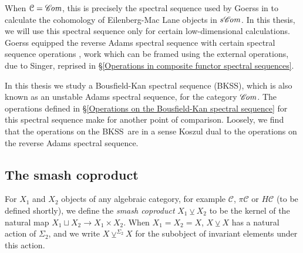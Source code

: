\documentclass[11pt]{amsart} \renewcommand{\baselinestretch}{1.2}
\theoremstyle{plain}
\numberwithin{equation}{section} %
\theoremstyle{plain}
\numberwithin{equation}{chapter} %
\renewcommand{\to}{\longrightarrow}
\newcommand{\scrC}{\mathscr{C}}
\newcommand{\calc}{\mathcal{C}}
\newcommand{\citeBOX}[2][]{\cite[\mbox{#1}]{#2}}
\newcommand{\PA}[1]{\pi#1}
\newcommand{\HA}[1]{H#1}
\newcommand{\algs}{{\scrC\!\textit{\normalfont\textit{om}}}}
\newcommand{\smashcoprod}{\veebar}%
\newcommand{\BKSS}{BKSS}
\newcommand{\SubsectionOrSection}[1]{\subsection{#1}}
\begin{document}
\begin{Pi-algebras and cohomology algebras}
When $\calc=\algs$, this is precisely the spectral sequence used by Goerss in \cite[Chapter V]{MR1089001} to calculate the cohomology of Eilenberg-Mac Lane objects in $s\algs$. In this thesis, we will use this spectral sequence only for certain low-dimensional calculations. Goerss equipped the reverse Adams spectral sequence with certain spectral sequence operations \citeBOX[\S14]{MR1089001}, work which can be framed using the external operations, due to Singer, reprised in \S\ref{Operations in composite functor spectral sequences}. %

In this thesis we study a Bousfield-Kan spectral sequence (BKSS), which is also known as an unstable Adams spectral sequence, for the category $\algs$. The operations defined in \S\ref{Operations on the Bousfield-Kan spectral sequence} for this spectral sequence make for another point of comparison. Loosely, we find that the operations on the \BKSS\ are in a sense Koszul dual to the operations on the reverse Adams spectral sequence.

\SubsectionOrSection{The smash coproduct}\label{subseq:The smash coproduct}
For $X_1$ and $X_2$ objects of any algebraic category, for example $\calc$, $\PA{\calc}$ or $\HA{\calc}$ (to be defined shortly), we define the \emph{smash coproduct} $X_1\smashcoprod X_2$ to be the kernel of the natural map $X_1\sqcup X_2\to X_1\times X_2$. When $X_1=X_2=X$, $X\smashcoprod X$ has a natural action of $\Sigma_2$, and we write $X\smashcoprod^{\Sigma_2} X$ for the subobject of invariant elements under this action.


\end{Pi-algebras and cohomology algebras}
\end{document}
